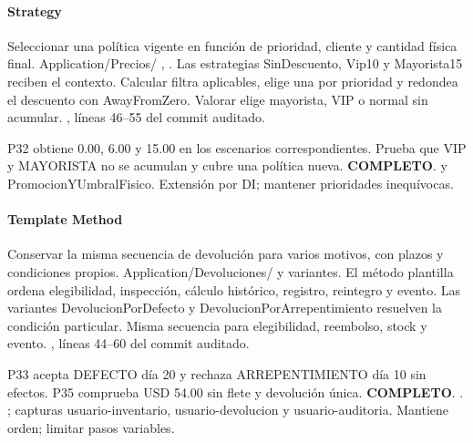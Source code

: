 \paragraph{Strategy}
 Seleccionar una política vigente en función de prioridad, cliente y cantidad física final.
 Application/Precios/ , . Las estrategias SinDescuento, Vip10 y Mayorista15 reciben el contexto. Calcular filtra aplicables, elige una por prioridad y redondea el descuento con AwayFromZero.
 Valorar elige mayorista, VIP o normal sin acumular.
 , líneas 46--55 del commit auditado.

 P32 obtiene 0.00, 6.00 y 15.00 en los escenarios correspondientes. Prueba que VIP y MAYORISTA no se acumulan y cubre una política nueva. \textbf{COMPLETO}.
  y PromocionYUmbralFisico.
 Extensión por DI; mantener prioridades inequívocas.
\medskip
\clearpage
\paragraph{Template Method}
 Conservar la misma secuencia de devolución para varios motivos, con plazos y condiciones propios.
 Application/Devoluciones/  y variantes. El método plantilla ordena elegibilidad, inspección, cálculo histórico, registro, reintegro y evento. Las variantes DevolucionPorDefecto y DevolucionPorArrepentimiento resuelven la condición particular.
 Misma secuencia para elegibilidad, reembolso, stock y evento.
 , líneas 44--60 del commit auditado.

 P33 acepta DEFECTO día 20 y rechaza ARREPENTIMIENTO día 10 sin efectos. P35 comprueba USD 54.00 sin flete y devolución única. \textbf{COMPLETO}.
 . ; capturas usuario-inventario, usuario-devolucion y usuario-auditoria.
 Mantiene orden; limitar pasos variables.
\medskip
\clearpage

